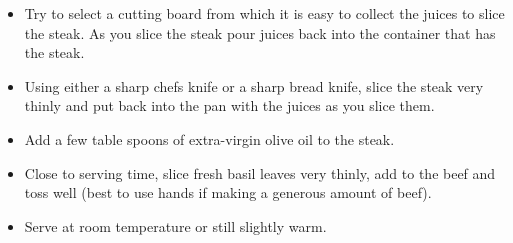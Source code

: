 \documentclass[11pt,letterpaper]{article}
\newcommand \fileName {SlicedGrilledBeef}
\begin{document}
\begin{description}
\begin{enumerate}
\begin{itemize}
        		\item Try to select a cutting board from which it is easy to collect the juices to slice the steak. As you slice the steak pour juices back into the container that has the steak.
		\item Using either a sharp chefs knife or a sharp bread knife, slice the steak very thinly and put back into the pan with the juices as you slice them.
		\item Add a few table spoons of extra-virgin olive oil to the steak.
		\item Close to serving time, slice fresh basil leaves very thinly, add to the beef and toss well (best to use hands if making a generous amount of beef).
		\item Serve at room temperature or still slightly warm.
	\end{itemize}
     	\end{enumerate}         
\end{description}

\end{document}
